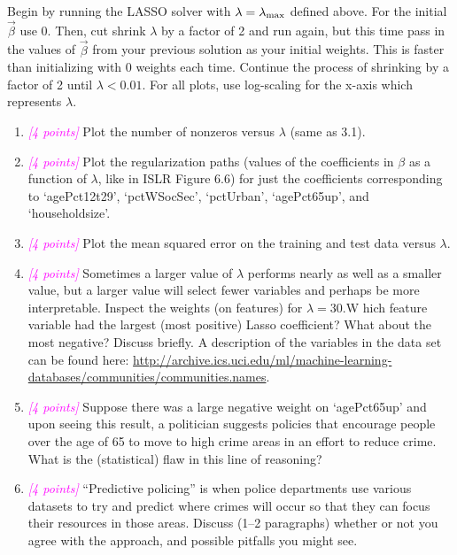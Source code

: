 \documentclass{article}
\newcommand{\points}[1]{\small\textcolor{magenta}{\emph{[#1 points]}} \normalsize}
\begin{document}
\vspace{1em}
Begin by running the LASSO solver with
$\lambda = \lambda_{\rm max}$
defined above.  
For the initial $\vec \beta$ use 0.  
Then, cut shrink $\lambda$ by a factor of 2 and run again, 
but this time pass in the values of $\vec \beta$ from your previous solution as 
your initial weights.  
This is faster than initializing with 0 weights each time.  
Continue the process of shrinking by a factor of 2 until $\lambda< 0.01$.
For all plots, use log-scaling for the x-axis which represents $\lambda$.
\begin{enumerate}
\item \points{4} Plot the number of nonzeros versus $\lambda$ (same as 3.1).
\item \points{4} Plot the regularization paths (values of the coefficients in $\beta$
  as a function of $\lambda$, like in ISLR Figure 6.6) for just the coefficients
  corresponding to `agePct12t29', `pctWSocSec', `pctUrban', `agePct65up', and `householdsize'.
\item \points{4} Plot the mean squared error on the training and test data versus $\lambda$.
\item \points{4} Sometimes a larger value of $\lambda$ performs nearly as well 
  as a smaller value, but a larger value will select fewer variables 
  and perhaps be more interpretable.  
  Inspect the weights (on features) for $\lambda= 30$.W
  hich feature variable had the largest (most positive) Lasso coefficient?  
  What about the most negative?
  Discuss briefly.  
  A description of the variables in the data set can be found here:
  \url{http://archive.ics.uci.edu/ml/machine-learning-databases/communities/communities.names}.
\item \points{4} Suppose there was a large negative weight on `agePct65up'
  and upon seeing this result, a politician suggests policies that encourage 
  people over the age of 65 to move to high crime areas in an effort to reduce crime.
  What is the (statistical) flaw in this line of reasoning?
\item \points{4} ``Predictive policing'' is when police departments use various
  datasets to try and predict where crimes will occur so that they can focus their
  resources in those areas. Discuss (1--2 paragraphs) whether or not you
  agree with the approach, and possible pitfalls you might see.
\end{enumerate}
\end{document}
